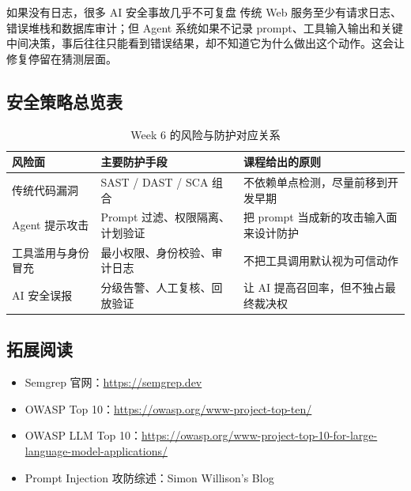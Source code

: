 \begin{warningbox}{如果没有日志，很多 AI 安全事故几乎不可复盘}
传统 Web 服务至少有请求日志、错误堆栈和数据库审计；但 Agent 系统如果不记录 prompt、工具输入输出和关键中间决策，事后往往只能看到错误结果，却不知道它为什么做出这个动作。这会让修复停留在猜测层面。
\end{warningbox}

\subsection{安全策略总览表}

\begin{table}[H]
\centering
\begin{tabular}{p{} p{} p{}}
\toprule
风险面 & 主要防护手段 & 课程给出的原则 \\
\midrule
传统代码漏洞 & SAST / DAST / SCA 组合 & 不依赖单点检测，尽量前移到开发早期 \\
Agent 提示攻击 & Prompt 过滤、权限隔离、计划验证 & 把 prompt 当成新的攻击输入面来设计防护 \\
工具滥用与身份冒充 & 最小权限、身份校验、审计日志 & 不把工具调用默认视为可信动作 \\
AI 安全误报 & 分级告警、人工复核、回放验证 & 让 AI 提高召回率，但不独占最终裁决权 \\
\bottomrule
\end{tabular}
\caption{Week 6 的风险与防护对应关系}
\end{table}

\subsection{拓展阅读}

\begin{itemize}
    \item Semgrep 官网：\url{https://semgrep.dev}
    \item OWASP Top 10：\url{https://owasp.org/www-project-top-ten/}
    \item OWASP LLM Top 10：\url{https://owasp.org/www-project-top-10-for-large-language-model-applications/}
    \item Prompt Injection 攻防综述：Simon Willison's Blog
\end{itemize}



